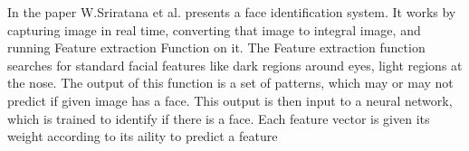 In the paper \cite{opencv} W.Sriratana et al. presents a face identification system. It works by capturing image in real time, converting that image to integral image,
and running Feature extraction Function on it. The Feature extraction function searches for standard facial features like dark regions around eyes, light regions at the nose. The output of this function
is a set of patterns, which may or may not predict if given image has a face. This output is then input to a neural network, which is trained to identify if there is a face. Each feature vector is given its weight according to its aility to predict a feature


